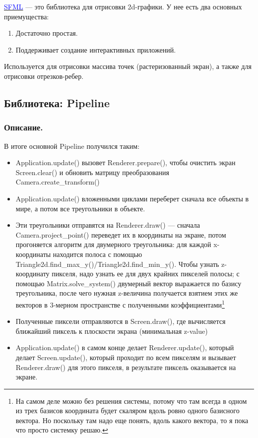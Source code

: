 \documentclass{article}
\begin{document}
\href{https://www.sfml-dev.org/}{\textcolor{blue}{SFML}} --- это библиотека для отрисовки 2d-графики. У нее есть два основных приемущества:

\begin{enumerate}

\item Достаточно простая.
\item Поддерживает создание интерактивных приложений.

\end{enumerate}

Используется для отрисовки массива точек (растеризованный экран), а также для отрисовки отрезков-ребер.


\newpage
\subsection{Библиотека: Pipeline}

\subsubsection{Описание.}

В итоге основной Pipeline получился таким:

\begin{itemize}

\item Application.update() вызовет Renderer.prepare(), чтобы очистить экран Screen.clear() и обновить матрицу преобразования Camera.create\_transform()
\item Application.update() вложенными циклами переберет сначала все объекты в мире, а потом все треугольники в объекте.
\item Эти треугольники отправятся на Renderer.draw() --- сначала Camera.project\_point() переведет их в координаты на экране, потом прогоняется алгоритм для двумерного треугольника: для каждой x-координаты находится полоса с помощью Triangle2d.find\_max\_y()/Triangle2d.find\_min\_y(). Чтобы узнать z-координату пикселя, надо узнать ее для двух крайних пикселей полосы; с помощью Matrix.solve\_system() двумерный вектор выражается по базису треугольника, после чего нужная z-величина получается взятием этих же векторов в 3-мерном пространстве с полученными коэффициентами\footnote{На самом деле можно без решения системы, потому что там всегда в одном из трех базисов координата будет скаляром вдоль ровно одного базисного вектора. Но поскольку там надо еще понять, вдоль какого вектора, то я пока что просто системку решаю.}
\item Полученные пиксели отправляются в Screen.draw(), где вычисляется ближайший пиксель к плоскости экрана (минимальная z-value)
\item Application.update() в самом конце делает Renderer.update(), который делает Screen.update(), который проходит по всем пикселям и вызывает Renderer.draw() для этого пикселя, в результате пиксель оказывается на экране.
\end{itemize}
\end{document}
